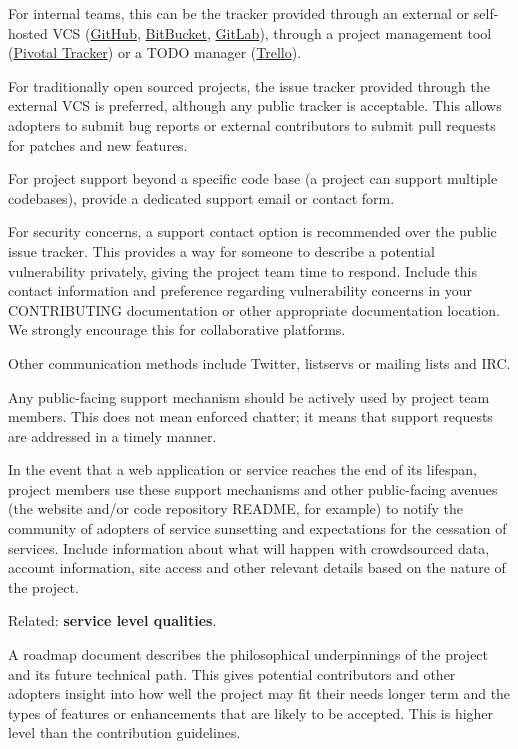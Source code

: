 \documentclass{article}
\newcounter{subsubsubsection}[subsubsection]
\begin{document}
For internal teams, this can be the tracker provided through an external or self-hosted VCS (\href{https://github.com/} {GitHub}, \href{https://bitbucket.org/} {BitBucket}, \href{https://about.gitlab.com/} {GitLab}), through a project management tool (\href{https://www.pivotaltracker.com/} {Pivotal Tracker}) or a TODO manager (\href{https://trello.com/} {Trello}).
 
For traditionally open sourced projects, the issue tracker provided through the external VCS is preferred, although any public tracker is acceptable. This allows adopters to submit bug reports or external contributors to submit pull requests for patches and new features. 

For project support beyond a specific code base (a project can support multiple codebases), provide a dedicated support email or contact form. 
 
For security concerns, a support contact option is recommended over the public issue tracker. This provides a way for someone to describe a potential vulnerability privately, giving the project team time to respond. Include this contact information and preference regarding vulnerability concerns in your CONTRIBUTING documentation or other appropriate documentation location. We strongly encourage this for collaborative platforms.
 
Other communication methods include Twitter, listservs or mailing lists and IRC. 
 
Any public-facing support mechanism should be actively used by project team members. This does not mean enforced chatter; it means that support requests are addressed in a timely manner. 
 
In the event that a web application or service reaches the end of its lifespan, project members use these support mechanisms and other public-facing avenues (the website and/or code repository README, for example) to notify the community of adopters of service sunsetting and expectations for the cessation of services. Include information about what will happen with crowdsourced data, account information, site access and other relevant details based on the nature of the project.
 
Related: \textbf{service level qualities}.

A roadmap document describes the philosophical underpinnings of the project and its future technical path. This gives potential contributors and other adopters insight into how well the project may fit their needs longer term and the types of features or enhancements that are likely to be accepted. This is higher level than the contribution guidelines.
\end{document}
